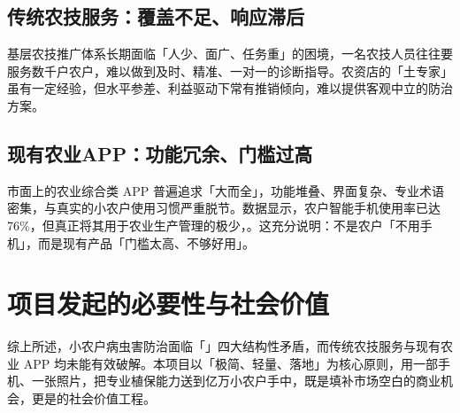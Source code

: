 \subsection{传统农技服务：覆盖不足、响应滞后}

基层农技推广体系长期面临「人少、面广、任务重」的困境，一名农技人员往往要服务数千户农户，难以做到及时、精准、一对一的诊断指导。农资店的「土专家」虽有一定经验，但水平参差、利益驱动下常有推销倾向，难以提供客观中立的防治方案。

\subsection{现有农业APP：功能冗余、门槛过高}

市面上的农业综合类 APP 普遍追求「大而全」，功能堆叠、界面复杂、专业术语密集，与真实的小农户使用习惯严重脱节。数据显示，农户智能手机使用率已达 76\%，但真正将其用于农业生产管理的极少，。这充分说明：不是农户「不用手机」，而是现有产品「门槛太高、不够好用」。

\section{项目发起的必要性与社会价值}

综上所述，小农户病虫害防治面临「」四大结构性矛盾，而传统农技服务与现有农业 APP 均未能有效破解。本项目以「极简、轻量、落地」为核心原则，用一部手机、一张照片，把专业植保能力送到亿万小农户手中，既是填补市场空白的商业机会，更是的社会价值工程。
